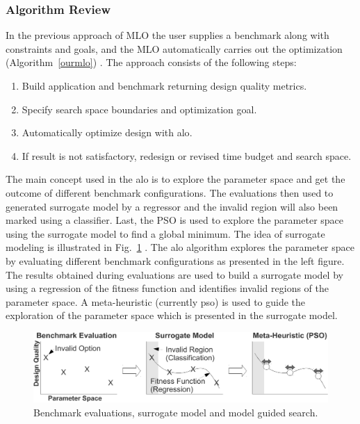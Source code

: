 \documentclass[11pt, runningheads,a4paper]{llncs}
\begin{document}
\subsubsection{Algorithm Review}
In the previous approach of MLO the user supplies a benchmark along with constraints and goals, and the MLO automatically carries out the optimization (Algorithm~\ref{ourmlo}) \cite{arc2012MLO}. The approach consists of the following steps:

\begin{enumerate}\addtolength{\itemsep}{-0.1\baselineskip}  
\item Build application and benchmark returning design quality metrics.
\item Specify search space boundaries and optimization goal.
\item Automatically optimize design with \ac{alo}.
\item If result is not satisfactory, redesign or revised time budget and search space.

\end{enumerate}
The main concept used in the \ac{alo} is to explore the parameter space and get the outcome of different benchmark configurations. The evaluations then used to generated surrogate model by a regressor and the invalid region will also been marked using a classifier. Last, the PSO is used to explore the parameter space using the surrogate model to find a global minimum.
The idea of surrogate modeling is illustrated in Fig.~\ref{fig:ouridea} \cite{arc2012MLO}. The \ac{alo} algorithm explores the parameter space by evaluating different benchmark configurations as presented in the left figure. The results obtained during evaluations are used to build a surrogate model by using a regression of the fitness function and identifies invalid regions of the parameter space. A meta-heuristic (currently \ac{pso}) is used to guide the exploration of the parameter space which is presented in the surrogate model. 



  \begin{figure}
     \centering
\includegraphics[width=1.0\textwidth]{./figs/surrogate_tobias.pdf}
        \caption{Benchmark evaluations, surrogate model and model guided search.}     
           \label{fig:ouridea}
  \end{figure}
 
\end{document}
